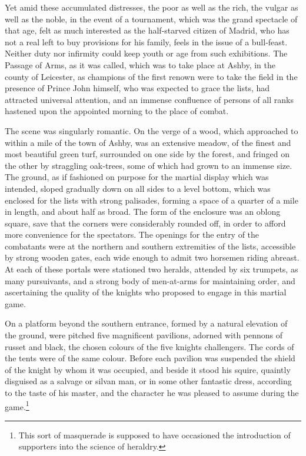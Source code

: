Yet amid these accumulated distresses, the poor as well as the rich, the
vulgar as well as the noble, in the event of a tournament, which was the
grand spectacle of that age, felt as much interested as the half-starved
citizen of Madrid, who has not a real left to buy provisions for his
family, feels in the issue of a bull-feast. Neither duty nor infirmity
could keep youth or age from such exhibitions. The Passage of Arms, as
it was called, which was to take place at Ashby, in the county of
Leicester, as champions of the first renown were to take the field in
the presence of Prince John himself, who was expected to grace the
lists, had attracted universal attention, and an immense confluence of
persons of all ranks hastened upon the appointed morning to the place of
combat.

The scene was singularly romantic. On the verge of a wood, which
approached to within a mile of the town of Ashby, was an extensive
meadow, of the finest and most beautiful green turf, surrounded on one
side by the forest, and fringed on the other by straggling oak-trees,
some of which had grown to an immense size. The ground, as if fashioned
on purpose for the martial display which was intended, sloped gradually
down on all sides to a level bottom, which was enclosed for the lists
with strong palisades, forming a space of a quarter of a mile in length,
and about half as broad. The form of the enclosure was an oblong square,
save that the corners were considerably rounded off, in order to afford
more convenience for the spectators. The openings for the entry of the
combatants were at the northern and southern extremities of the lists,
accessible by strong wooden gates, each wide enough to admit two
horsemen riding abreast. At each of these portals were stationed two
heralds, attended by six trumpets, as many pursuivants, and a strong
body of men-at-arms for maintaining order, and ascertaining the quality
of the knights who proposed to engage in this martial game.

On a platform beyond the southern entrance, formed by a natural
elevation of the ground, were pitched five magnificent pavilions,
adorned with pennons of russet and black, the chosen colours of the five
knights challengers. The cords of the tents were of the same colour.
Before each pavilion was suspended the shield of the knight by whom it
was occupied, and beside it stood his squire, quaintly disguised as a
salvage or silvan man, or in some other fantastic dress, according to
the taste of his master, and the character he was pleased to assume
during the game.\footnote{This sort of masquerade is supposed to have
occasioned the introduction of supporters into the science of heraldry.}

